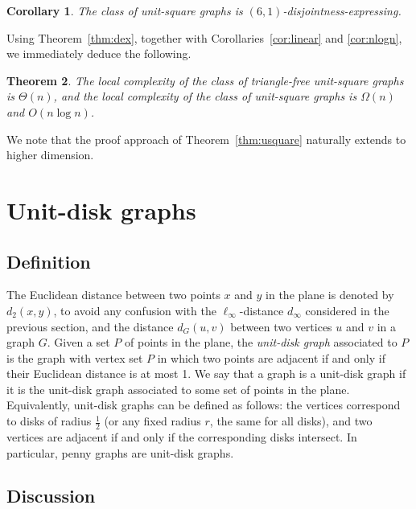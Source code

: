 \documentclass[a4paper,reqno, 12pt]{amsart}
\newtheorem{theorem}{Theorem}[section]
\newtheorem{corollary}[theorem]{Corollary}
\begin{document}
\begin{corollary}\label{cor:usquare}
  The class of unit-square graphs is $(6,
  1)$-disjointness-expressing.
\end{corollary}


Using Theorem~\ref{thm:dex}, together with Corollaries~\ref{cor:linear} and \ref{cor:nlogn}, we immediately deduce the following.



\begin{theorem}
  The local complexity of the class of triangle-free unit-square graphs
is $\Theta(n)$, and the local complexity of the class of unit-square
graphs is $\Omega(n)$ and $O(n\log n)$.
\end{theorem}

 We note that the proof approach of Theorem~\ref{thm:usquare} naturally extends to
higher dimension.

\section{Unit-disk graphs}\label{sec:udg}



\subsection{Definition}

The Euclidean distance between two points $x$ and $y$ in the plane is
denoted by $d_2(x,y)$, to avoid any confusion with the
$\ell_\infty$-distance $d_\infty$ considered in the previous section, and the
distance $d_G(u,v)$ between two vertices $u$ and $v$ in a graph $G$.
Given a set $P$ of points in the plane, the \emph{unit-disk graph}
associated to $P$  is the graph with vertex set $P$ in which two
points are adjacent if and only if their Euclidean distance is at most
1. We say that a graph is a unit-disk graph if it is the unit-disk
graph associated to some set of points in the plane. Equivalently,
unit-disk graphs can be defined as follows: the vertices correspond to
disks of radius $\tfrac12$ (or any fixed radius $r$, the same for all
disks), and two vertices are adjacent if and only if the corresponding
disks intersect. In particular, penny graphs are unit-disk graphs.

\subsection{Discussion}\label{sec:outudg}
\end{document}
